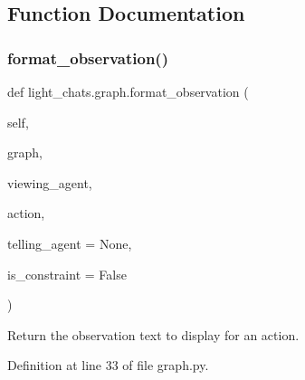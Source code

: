 \subsection{Function Documentation}
\mbox{\label{namespacelight__chats_1_1graph_a6d359942394976812f0055affc289f56}} 
\subsubsection{\texorpdfstring{format\+\_\+observation()}{format\_observation()}}
{\footnotesize\ttfamily def light\+\_\+chats.\+graph.\+format\+\_\+observation (\begin{DoxyParamCaption}\item[{}]{self,  }\item[{}]{graph,  }\item[{}]{viewing\+\_\+agent,  }\item[{}]{action,  }\item[{}]{telling\+\_\+agent = {\ttfamily None},  }\item[{}]{is\+\_\+constraint = {\ttfamily False} }\end{DoxyParamCaption})}

\begin{DoxyVerb}Return the observation text to display for an action.
\end{DoxyVerb}
 

Definition at line 33 of file graph.\+py.


